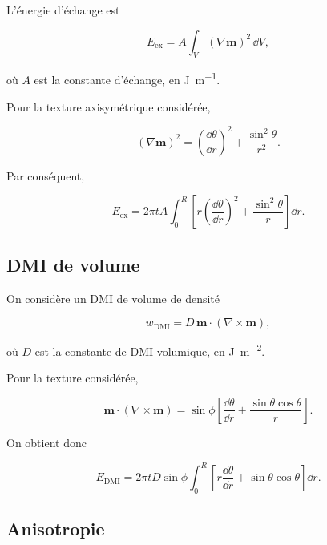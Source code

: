 \documentclass[a4paper,11pt]{article}
\newcommand{\m}{\bm{m}}
\begin{document}
L'énergie d'échange est

\begin{equation}
E_{\mathrm{ex}}
=
A
\int_V
(\nabla\m)^2
\,\dd V,
\end{equation}

où $A$ est la constante d'échange, en \si{J.m^{-1}}.

Pour la texture axisymétrique considérée,

\begin{equation}
(\nabla\m)^2
=
\left(
\frac{\dd\theta}{\dd r}
\right)^2
+
\frac{\sin^2\theta}{r^2}.
\end{equation}

Par conséquent,

\begin{equation}
E_{\mathrm{ex}}
=
2\pi t A
\int_0^R
\left[
r\left(\frac{\dd\theta}{\dd r}\right)^2
+
\frac{\sin^2\theta}{r}
\right]
\dd r.
\end{equation}

\subsection{DMI de volume}

On considère un DMI de volume de densité

\begin{equation}
w_{\mathrm{DMI}}
=
D\,\m\cdot(\nabla\times\m),
\end{equation}

où $D$ est la constante de DMI volumique, en \si{J.m^{-2}}.

Pour la texture considérée,

\begin{equation}
\boxed{
\m\cdot(\nabla\times\m)
=
\sin\phi
\left[
\frac{\dd\theta}{\dd r}
+
\frac{\sin\theta\cos\theta}{r}
\right].
}
\end{equation}

On obtient donc

\begin{equation}
E_{\mathrm{DMI}}
=
2\pi tD\sin\phi
\int_0^R
\left[
r\frac{\dd\theta}{\dd r}
+
\sin\theta\cos\theta
\right]
\dd r.
\end{equation}

\subsection{Anisotropie}
\end{document}
